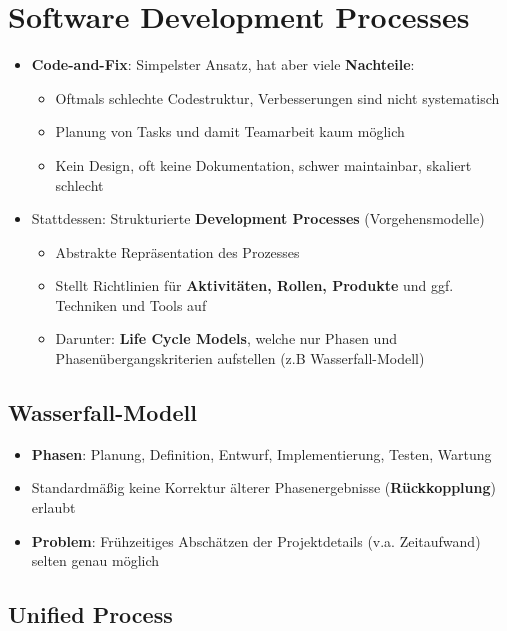 \section{Software Development Processes}
\label{sdp:sec:software_development_processes}

\begin{itemize}
	\item \textbf{Code-and-Fix}: Simpelster Ansatz, hat aber viele \textbf{Nachteile}:
	\begin{itemize}
		\item Oftmals schlechte Codestruktur, Verbesserungen sind nicht systematisch
		\item Planung von Tasks und damit Teamarbeit kaum möglich
		\item Kein Design, oft keine Dokumentation, schwer maintainbar, skaliert schlecht
	\end{itemize}
	\item Stattdessen: Strukturierte \textbf{Development Processes} (Vorgehensmodelle)
	\begin{itemize}
		\item Abstrakte Repräsentation des Prozesses
		\item Stellt Richtlinien für \textbf{Aktivitäten, Rollen, Produkte} und ggf. Techniken und Tools auf
		\item Darunter: \textbf{Life Cycle Models}, welche nur Phasen und Phasenübergangskriterien aufstellen (z.B Wasserfall-Modell)
	\end{itemize}
\end{itemize}

\subsection{Wasserfall-Modell}
\label{sdp:sub:wasserfall_modell}

\begin{itemize}
	\item \textbf{Phasen}: Planung, Definition, Entwurf, Implementierung, Testen, Wartung
	\item Standardmäßig keine Korrektur älterer Phasenergebnisse (\textbf{Rückkopplung}) erlaubt
	\item \textbf{Problem}: Frühzeitiges Abschätzen der Projektdetails (v.a. Zeitaufwand) selten genau möglich
\end{itemize}

\subsection{Unified Process}
\label{sdp:sub:unified_process}

